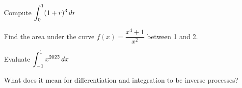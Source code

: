 \documentclass[notes]{subfiles}
\begin{document}
		\begin{ex}
			Compute \(\displaystyle \int_0^1 (1+r)^3\, dr\)
		\end{ex}
			
		\begin{ex}
			Find the area under the curve \(f(x) = \dfrac{x^4 + 1}{x^2}\) between 1 and 2.
		\end{ex}

		\begin{ex}
			Evaluate \(\displaystyle \int_{-1}^1 x^{2023}\, dx\)
		\end{ex}
			
		\begin{ex}
			What does it mean for differentiation and integration to be inverse processes?
		\end{ex}
	\clearpage	
\end{document}
